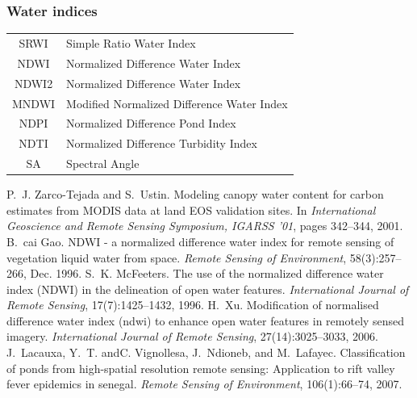 \documentclass[compress]{beamer}
\begin{document}
\begin{frame}
\frametitle{Water indices}
\footnotesize \centering
\begin{tabular}{|c|l|}
\hline
SRWI & Simple Ratio Water Index \cite{ZarcoTejada2001-SRWI} \\
NDWI & Normalized Difference Water Index  \cite{Gao1996-NDWI} \\
NDWI2 &  Normalized Difference Water Index \cite{McFeeters1996-NDWI2} \\
MNDWI &  Modified Normalized Difference Water Index  \cite{Xu2006-MNDWI} \\
NDPI &  Normalized Difference Pond Index \cite{Lacaux2007-NDTI} \\
NDTI &  Normalized Difference Turbidity Index  \cite{Lacaux2007-NDTI} \\
SA & Spectral Angle \\
\hline
\end{tabular}
\begin{thebibliography}{noidea}
\tiny
{}
P.~J. Zarco-Tejada and S.~Ustin.
 Modeling canopy water content for carbon estimates from {MODIS} data
  at land {EOS} validation sites.
 In {\em International Geoscience and Remote Sensing Symposium, IGARSS
  '01}, pages 342--344, 2001.
B.~cai Gao.
 {NDWI} - a normalized difference water index for remote sensing of
  vegetation liquid water from space.
 {\em Remote Sensing of Environment}, 58(3):257--266,
        Dec. 1996.
S.~K. McFeeters.
 The use of the normalized difference water index ({NDWI}) in the
  delineation of open water features.
 {\em International Journal of Remote Sensing}, 17(7):1425--1432,
  1996.
H.~Xu.
 Modification of normalised difference water index (ndwi) to enhance
  open water features in remotely sensed imagery.
 {\em International Journal of Remote Sensing}, 27(14):3025--3033,
  2006.
J.~Lacauxa, Y.~T. andC. Vignollesa, J.~Ndioneb, and M.~Lafayec.
 Classification of ponds from high-spatial resolution remote sensing:
  Application to rift valley fever epidemics in senegal.
 {\em Remote Sensing of Environment}, 106(1):66--74, 2007.
\end{thebibliography}
\end{frame}
\end{document}
